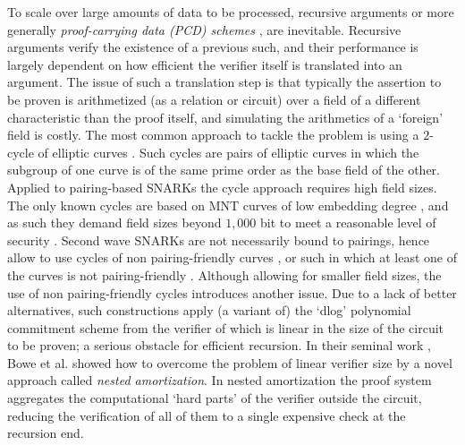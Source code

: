 \documentclass[10pt,article,oneside]{memoir}
\theoremstyle{definition}
\theoremstyle{remark}
\begin{document}
To scale over large amounts of data to be processed, recursive arguments or more generally \textit{proof-carrying data (PCD) schemes} \cite{PCD, SNARKsfromPCD}, are inevitable. 
Recursive arguments verify the existence of a previous such, and their performance is largely dependent on how efficient the verifier itself is translated into an argument. 
The issue of such a translation step is that typically the assertion to be proven is arithmetized (as a relation or circuit) over a field of a different characteristic than the proof itself, and simulating the arithmetics of a `foreign' field is costly.
The most common approach to tackle the problem is using a $2$-cycle of elliptic curves \cite{AmicablePairs, Cycles}.
Such cycles are pairs of elliptic curves in which the subgroup of one curve is of the same prime order as the base field of the other. 
Applied to pairing-based SNARKs the cycle approach requires high field sizes. 
The only known cycles are based on MNT curves of low embedding degree \cite{Cycles}, and as such they demand field sizes beyond $1,000$ bit to meet a reasonable level of security  \cite{GuillevicTNFS}\footnotemark. 
%
Second wave SNARKs are not necessarily bound to pairings, hence allow to use cycles of non pairing-friendly curves \cite{Halo, Halo2}, or such in which at least one of the curves is not pairing-friendly \cite{Mina}.  
Although allowing for smaller field sizes, the use of non pairing-friendly cycles introduces another issue.
Due to a lack of better alternatives, such constructions apply (a variant of) the `dlog' polynomial commitment scheme from \cite{BootleGroth} the verifier of which is linear in the size of the circuit to be proven; a serious obstacle for efficient recursion.
In their seminal work \cite{Halo}, Bowe et al. showed how to overcome the problem of linear verifier size by a novel approach called \textit{nested amortization}. 
In nested amortization the proof system aggregates the computational `hard parts' of the verifier outside the circuit, reducing the verification of all of them to a single expensive check at the recursion end.
\end{document}
